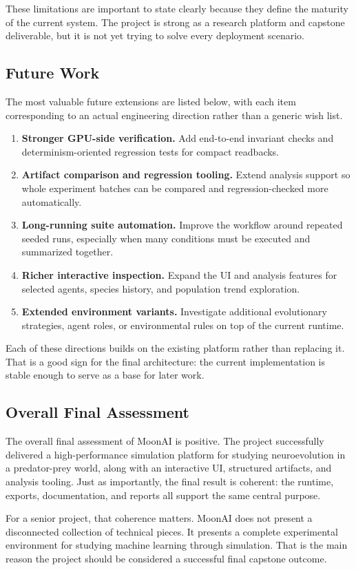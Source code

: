 These limitations are important to state clearly because they define the maturity of the current
system. The project is strong as a research platform and capstone deliverable, but it is not yet
trying to solve every deployment scenario.

\subsection{Future Work}

The most valuable future extensions are listed below, with each item corresponding to an actual
engineering direction rather than a generic wish list.

\begin{enumerate}[leftmargin=*]
  \item \textbf{Stronger GPU-side verification.} Add end-to-end invariant checks and
  determinism-oriented regression tests for compact readbacks.

  \item \textbf{Artifact comparison and regression tooling.} Extend analysis support so whole
  experiment batches can be compared and regression-checked more automatically.

  \item \textbf{Long-running suite automation.} Improve the workflow around repeated seeded runs,
  especially when many conditions must be executed and summarized together.

  \item \textbf{Richer interactive inspection.} Expand the UI and analysis features for selected
  agents, species history, and population trend exploration.

  \item \textbf{Extended environment variants.} Investigate additional evolutionary strategies,
  agent roles, or environmental rules on top of the current runtime.
\end{enumerate}

Each of these directions builds on the existing platform rather than replacing it. That is a good
sign for the final architecture: the current implementation is stable enough to serve as a base
for later work.

\subsection{Overall Final Assessment}

The overall final assessment of MoonAI is positive. The project successfully delivered a
high-performance simulation platform for studying neuroevolution in a predator-prey world,
along with an interactive UI, structured artifacts, and analysis tooling. Just as importantly,
the final result is coherent: the runtime, exports, documentation, and reports all support the
same central purpose.

For a senior project, that coherence matters. MoonAI does not present a disconnected collection
of technical pieces. It presents a complete experimental environment for studying machine
learning through simulation. That is the main reason the project should be considered a
successful final capstone outcome.
